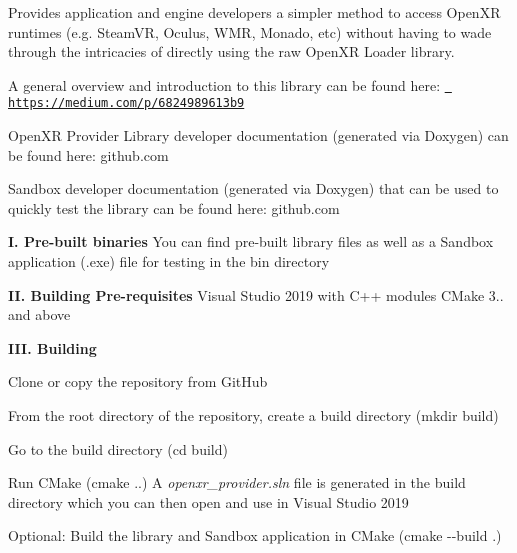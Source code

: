 Provides application and engine developers a simpler method to access Open\+XR runtimes (e.\+g. Steam\+VR, Oculus, W\+MR, Monado, etc) without having to wade through the intricacies of directly using the raw Open\+XR Loader library.

A general overview and introduction to this library can be found here\+: \href{https://medium.com/p/6824989613b9}{\texttt{ https\+://medium.\+com/p/6824989613b9}}

Open\+XR Provider Library developer documentation (generated via Doxygen) can be found here\+: github.\+com

Sandbox developer documentation (generated via Doxygen) that can be used to quickly test the library can be found here\+: github.\+com

{\bfseries{I. Pre-\/built binaries}} You can find pre-\/built library files as well as a Sandbox application (.exe) file for testing in the {\ttfamily bin} directory

{\bfseries{II. Building Pre-\/requisites}} Visual Studio 2019 with C++ modules C\+Make 3.. and above

{\bfseries{I\+II. Building}}
\begin{DoxyEnumerate}
\item Clone or copy the repository from Git\+Hub
\item From the root directory of the repository, create a build directory ({\ttfamily mkdir build})
\item Go to the build directory ({\ttfamily cd build})
\item Run C\+Make ({\ttfamily cmake ..}) A {\itshape openxr\+\_\+provider.\+sln} file is generated in the build directory which you can then open and use in Visual Studio 2019
\item Optional\+: Build the library and Sandbox application in C\+Make ({\ttfamily cmake -\/-\/build .}) 
\end{DoxyEnumerate}